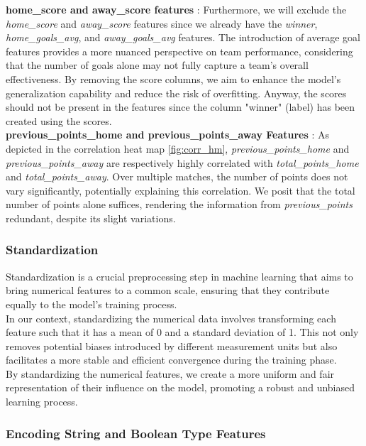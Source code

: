 \documentclass[a4paper,12pt]{article}
\begin{document}
{\bf home\_score and away\_score features} : Furthermore, we will exclude the {\it home\_score} and {\it away\_score} features since we already have the {\it winner}, {\it home\_goals\_avg}, and {\it away\_goals\_avg} features. The introduction of average goal features provides a more nuanced perspective on team performance, considering that the number of goals alone may not fully capture a team's overall effectiveness. By removing the score columns, we aim to enhance the model's generalization capability and reduce the risk of overfitting. Anyway, the scores should not be present in the features since the column "winner" (label) has been created using the scores.\\

{\bf previous\_points\_home and previous\_points\_away Features} : As depicted in the correlation heat map \ref{fig:corr_hm}, \textit{previous\_points\_home} and \textit{previous\_points\_away} are respectively highly correlated with \textit{total\_points\_home} and \textit{total\_points\_away}. Over multiple matches, the number of points does not vary significantly, potentially explaining this correlation. We posit that the total number of points alone suffices, rendering the information from \textit{previous\_points} redundant, despite its slight variations.


\subsubsection{Standardization}

Standardization is a crucial preprocessing step in machine learning that aims to bring numerical features to a common scale, ensuring that they contribute equally to the model's training process.\\

In our context, standardizing the numerical data involves transforming each feature such that it has a mean of 0 and a standard deviation of 1. This not only removes potential biases introduced by different measurement units but also facilitates a more stable and efficient convergence during the training phase.\\

By standardizing the numerical features, we create a more uniform and fair representation of their influence on the model, promoting a robust and unbiased learning process.

\subsubsection{Encoding String and Boolean Type Features}
\end{document}
